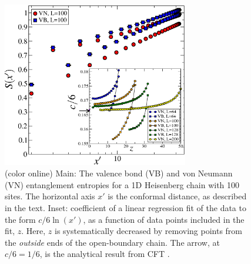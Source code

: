 \documentclass[prl,aps,twocolumn,floatfix,amsmath,amssymb,superscriptaddress,tightenlines]{revtex4}
\begin{document}
\begin{figure}
{
\includegraphics[width=3.2in]{fig1_inset.eps}
\caption{(color online) Main: The valence bond (VB) and von Neumann (VN) entanglement entropies for a 1D Heisenberg chain with 100 sites.  The horizontal axis $x'$ is the conformal distance, as described in the text.  Inset:  coefficient of a linear regression fit of the data to the form $c/6 \ln(x')$, as a function of data points included in the fit, $z$.  Here, $z$ is systematically decreased by removing points from the {\it outside} ends of the open-boundary chain.   The arrow, at $c/6=1/6$, is the analytical result from CFT \cite{Cardy}.
\label{1D}}}
\end{figure}
\end{document}
